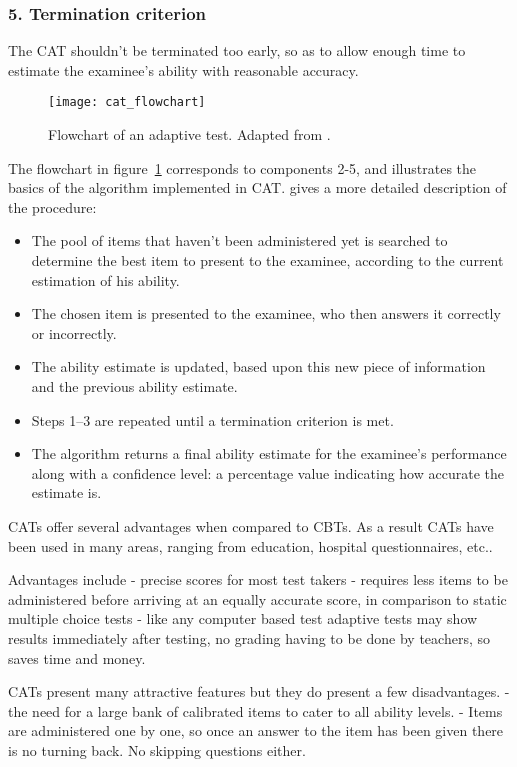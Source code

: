\subsubsection{5. Termination criterion}

The CAT shouldn't be terminated too early, so as to allow enough time to estimate the examinee's ability with reasonable accuracy.

\begin{figure}[H]
\centering
\texttt{[image: cat\_flowchart]}
\caption{Flowchart of an adaptive test. Adapted from \cite{SIETTE}.}
\label{fig:cat_flowchart}
\end{figure}

The flowchart in figure~\ref{fig:cat_flowchart} corresponds to components 2-5, and illustrates the basics of the algorithm implemented in CAT. \cite{CAT-Wiki} gives a more detailed description of the procedure:
\begin{itemize}
\item[1.] The pool of items that haven't been administered yet is searched to determine the best item to present to the examinee, according to the current estimation of his ability.
\item[2.] The chosen item is presented to the examinee, who then answers it correctly or incorrectly.
\item[3.] The ability estimate is updated, based upon this new piece of information and the previous ability estimate.
\item[4.] Steps 1–3 are repeated until a termination criterion is met.
\item[5.] The algorithm returns a final ability estimate for the examinee's performance along with a confidence level: a percentage value indicating how accurate the estimate is.
\end{itemize}

CATs offer several advantages when compared to CBTs. As a result CATs have been used in many areas, ranging from education, hospital questionnaires, etc..

Advantages include
- precise scores for most test takers
- requires less items to be administered before arriving at an equally accurate score, in comparison to static multiple choice tests
- like any computer based test adaptive tests may show results immediately after testing, no grading having to be done by teachers, so saves time and money.

CATs present many attractive features but they do present a few disadvantages.
- the need for a large bank of calibrated items to cater to all ability levels.
- Items are administered one by one, so once an answer to the item has been given there is no turning back. No skipping questions either.

